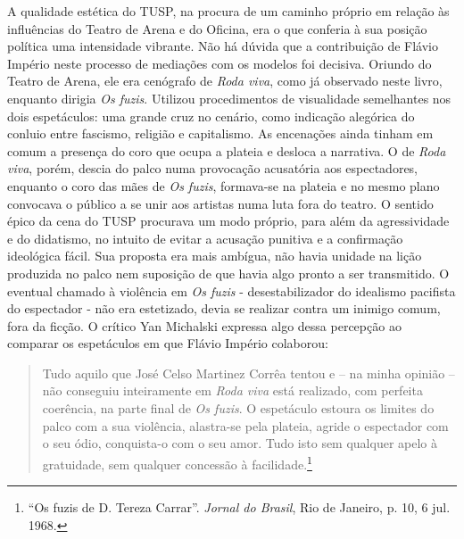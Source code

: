 A qualidade estética do TUSP, na procura de um caminho próprio em
relação às influências do Teatro de Arena e do Oficina, era o que
conferia à sua posição política uma intensidade vibrante. Não há dúvida
que a contribuição de Flávio Império neste processo de mediações com os
modelos foi decisiva. Oriundo do Teatro de Arena, ele era cenógrafo de
\textit{Roda viva}, como já observado neste livro, enquanto dirigia \textit{Os
fuzis}. Utilizou procedimentos de visualidade semelhantes nos dois
espetáculos: uma grande cruz no cenário, como indicação alegórica do
conluio entre fascismo, religião e capitalismo. As encenações ainda
tinham em comum a presença do coro que ocupa a plateia e desloca a
narrativa. O de \textit{Roda viva}, porém, descia do palco numa provocação
acusatória aos espectadores, enquanto o coro das mães de \textit{Os fuzis},
formava-se na plateia e no mesmo plano convocava o público a se unir aos
artistas numa luta fora do teatro. O sentido épico da cena do TUSP
procurava um modo próprio, para além da agressividade e do didatismo, no
intuito de evitar a acusação punitiva e a confirmação ideológica fácil.
Sua proposta era mais ambígua, não havia unidade na lição produzida no
palco nem suposição de que havia algo pronto a ser transmitido. O
eventual chamado à violência em \textit{Os fuzis} - desestabilizador do
idealismo pacifista do espectador - não era estetizado, devia se
realizar contra um inimigo comum, fora da ficção. O crítico Yan
Michalski expressa algo dessa percepção ao comparar os espetáculos em
que Flávio Império colaborou:

\begin{quote}
Tudo aquilo que José Celso Martinez Corrêa tentou e -- na minha opinião
-- não conseguiu inteiramente em \textit{Roda viva} está realizado, com
perfeita coerência, na parte final de \textit{Os fuzis}. O espetáculo
estoura os limites do palco com a sua violência, alastra-se pela
plateia, agride o espectador com o seu ódio, conquista-o com o seu amor.
Tudo isto sem qualquer apelo à gratuidade, sem qualquer concessão à
facilidade.\footnote{“Os fuzis de D. Tereza Carrar”. \textit{Jornal do
  Brasil}, Rio de Janeiro, p. 10, 6 jul. 1968.}
\end{quote}

